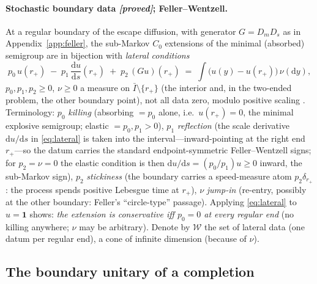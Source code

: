 \documentclass[11pt]{article}
\theoremstyle{definition}
\theoremstyle{remark}
\newcommand{\dd}{\mathrm{d}}
\begin{document}
\paragraph{Stochastic boundary data \emph{[proved]}; Feller--Wentzell.}
At a regular boundary of the escape diffusion, with generator
$G=D_{m}D_{s}$ as in Appendix~\ref{app:feller}, the sub-Markov $C_{0}$
extensions of the minimal (absorbed) semigroup are in bijection with
\emph{lateral conditions}
\begin{equation}
p_{0}\,u(r_{+})\;-\;p_{1}\,\frac{\dd u}{\dd s}(r_{+})
\;+\;p_{2}\,(Gu)(r_{+})
\;=\;\int\bigl(u(y)-u(r_{+})\bigr)\,\nu(\dd y),
\label{eq:lateral}
\end{equation}
$p_{0},p_{1},p_{2}\ge0$, $\nu\ge0$ a measure on
$\bar I\setminus\{r_{+}\}$ (the interior and, in the two-ended problem,
the other boundary point), not all data zero, modulo positive scaling
\cite{Feller1952,Feller1957,ItoMcKean}. Terminology: $p_{0}$
\emph{killing} (absorbing $=p_{0}$ alone, i.e.\ $u(r_{+})=0$, the
minimal explosive semigroup; elastic $=p_{0},p_{1}>0$), $p_{1}$
\emph{reflection} (the scale derivative $\dd u/\dd s$ in
\eqref{eq:lateral} is taken into the interval---inward-pointing at the
right end $r_{+}$---so the datum carries the standard endpoint-symmetric
Feller--Wentzell signs; for $p_{2}=\nu=0$ the elastic condition is then
$\dd u/\dd s=(p_{0}/p_{1})u\ge0$ inward, the sub-Markov sign), $p_{2}$ \emph{stickiness} (the boundary carries a
speed-measure atom $p_{2}\delta_{r_{+}}$: the process spends positive
Lebesgue time at $r_{+}$), $\nu$ \emph{jump-in} (re-entry, possibly at
the other boundary: Feller's ``circle-type'' passage). Applying
\eqref{eq:lateral} to $u=\mathbf 1$ shows: \emph{the extension is
conservative iff $p_{0}=0$ at every regular end} (no killing anywhere;
$\nu$ may be arbitrary). Denote by $\mathcal W$ the set of lateral data
(one datum per regular end), a cone of infinite dimension (because of
$\nu$).

\subsection{The boundary unitary of a completion}
\label{app:completions-unitary}
\end{document}
